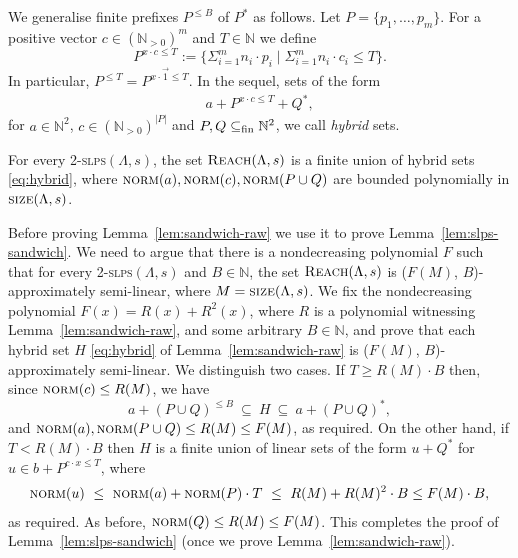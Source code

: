 \documentclass[a4paper, UKenglish, cleveref, autoref, thm-restate]{lipics-v2021}
\newcommand{\N}{\mathbb{N}}
\newcommand{\set}[1]{\{#1\}}
\newcommand{\setof}[2]{\set{#1 \mid #2}}
\newcommand{\card}[1]{\left|#1\right|}
\newcommand{\fin}{\textup{fin}}
\newcommand{\reach}{\textsc{Reach}}
\newcommand{\slps}{\textsc{slps}\xspace}
\newcommand{\norm}{\textsc{norm}}
\newcommand{\size}{\textsc{size}}
\renewcommand{\vec}[1]{\overrightarrow{#1}}
\newcommand{\subseteqfin}{\subseteq_{\fin}}
\newcommand{\kanapka}[2]{(#1, #2)-approximately semi-linear}
\newcommand{\dslps}{2-\slps}
\newcommand{\Npos}{\N_{>0}}
\begin{document}
\begin{appendixproof}
We generalise finite prefixes $P^{\leq B}$ of $P^*$ as follows.
Let $P = \set{p_1, \ldots, p_m}$. 
For a positive vector $c \in (\Npos)^m$ and $T \in \N$ we define
\[
P^{x \cdot c \leq T} := \setof{\Sigma_{i=1}^m n_i \cdot p_i}{\Sigma_{i=1}^m n_i \cdot c_i \leq T}.
\]
In particular, $P^{\leq T} = P^{x\cdot \vec 1  \leq T}$.
In the sequel, sets of the form
\begin{align} \label{eq:hybrid}
a + P^{x \cdot c \leq T} + Q^*,
\end{align}
for $a\in\N^2$, $c \in (\Npos)^{\card P}$ and $P,Q\subseteqfin \N^2$, 
we call \emph{hybrid} sets.



\begin{lemma}\label{lem:sandwich-raw}
For every \dslps $(\Lambda,s)$,
the set $\reach(\Lambda,s)$ is a finite union of hybrid sets \eqref{eq:hybrid}, 
where $\norm(a),  \norm(c), \norm(P \cup Q)$ are bounded polynomially in $\size(\Lambda,s)$.
\end{lemma}

Before proving Lemma~\ref{lem:sandwich-raw} we use it to prove Lemma~\ref{lem:slps-sandwich}.
We need to argue that there is a nondecreasing polynomial $F$ such that 
for every \dslps $(\Lambda, s)$ and $B\in\N$, the set $\reach(\Lambda,s)$ is
\kanapka {$F(M)$} {$B$}, where $M=\size(\Lambda,s)$.
We fix the nondecreasing polynomial $F(x) = R(x) + R^2(x)$, where $R$ is a polynomial witnessing 
Lemma~\ref{lem:sandwich-raw}, and some arbitrary $B \in \N$,
and prove that each hybrid set $H$ \eqref{eq:hybrid} 
of Lemma~\ref{lem:sandwich-raw} is
\kanapka {$F(M)$} {$B$}.
We distinguish two cases.
If $T \geq R(M) \cdot B$ then, since $\norm(c)\leq R(M)$, we have
\[
a + (P \cup Q)^{\leq B} \ \subseteq \ H \ \subseteq \ a + (P \cup Q)^*,
\]
and $\norm(a), \norm(P \cup Q) \leq R(M) \leq F(M)$, as required. 
On the other hand, if  $T < R(M) \cdot B$ then $H$ is a finite union
of linear sets of the form $u + Q^*$ for $u \in b + P^{c \cdot x \leq T}$, where
\begin{align*}
\norm(u) \ \leq \ \norm(a) + \norm(P) \cdot T 
\ \leq \ R(M) + R(M)^2 \cdot B \leq  F(M) \cdot B,
\end{align*}
as required. 
As before,  $\norm(Q) \leq R(M) \leq F(M)$.
This completes the proof of Lemma~\ref{lem:slps-sandwich} (once
we prove Lemma~\ref{lem:sandwich-raw}). 
\end{appendixproof}
\end{document}

